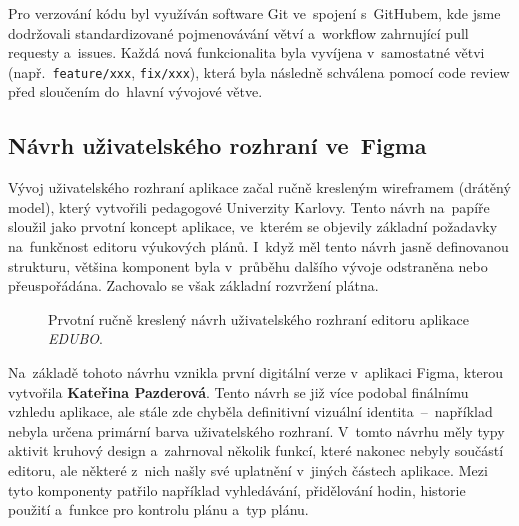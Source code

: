 \documentclass[male,czech,api_bc]{kitheses}
\begin{document}
Pro verzování kódu byl využíván software Git ve~spojení s~GitHubem, kde jsme dodržovali standardizované pojmenovávání větví a~workflow zahrnující pull requesty a~issues. Každá nová funkcionalita byla vyvíjena v~samostatné větvi (např.~\texttt{feature/xxx}, \texttt{fix/xxx}), která byla následně schválena pomocí code review před sloučením do~hlavní vývojové větve.

\subsection{Návrh uživatelského rozhraní ve~Figma}

Vývoj uživatelského rozhraní aplikace začal ručně kresleným wireframem (drátěný model), který vytvořili pedagogové Univerzity Karlovy. Tento návrh na~papíře sloužil jako prvotní koncept aplikace, ve~kterém se objevily základní požadavky na~funkčnost editoru výukových plánů. I~když měl tento návrh jasně definovanou strukturu, většina komponent byla v~průběhu dalšího vývoje odstraněna nebo přeuspořádána. Zachovalo se však základní rozvržení plátna.

\begin{figure}[H]
	\centering
	\caption{Prvotní ručně kreslený návrh uživatelského rozhraní editoru aplikace \textit{EDUBO}.}
	\label{fig:edubo-navrh-1}
\end{figure}

Na~základě tohoto návrhu vznikla první digitální verze v~aplikaci Figma, kterou vytvořila \textbf{Kateřina Pazderová}. Tento návrh se již více podobal finálnímu vzhledu aplikace, ale stále zde chyběla definitivní vizuální identita~--~například nebyla určena primární barva uživatelského rozhraní. V~tomto návrhu měly typy aktivit kruhový design a~zahrnoval několik funkcí, které nakonec nebyly součástí editoru, ale některé z~nich našly své uplatnění v~jiných částech aplikace. Mezi tyto komponenty patřilo například vyhledávání, přidělování hodin, historie použití a~funkce pro kontrolu plánu a~typ plánu.
\end{document}
